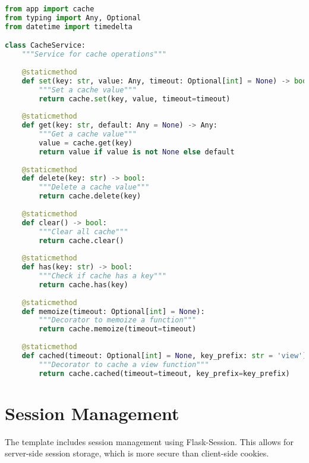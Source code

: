 \documentclass{article}
\begin{document}
\begin{lstlisting}[language=python, caption=Cache Service in app/services/cache\_service.py]
from app import cache
from typing import Any, Optional
from datetime import timedelta

class CacheService:
    """Service for cache operations"""
    
    @staticmethod
    def set(key: str, value: Any, timeout: Optional[int] = None) -> bool:
        """Set a cache value"""
        return cache.set(key, value, timeout=timeout)
    
    @staticmethod
    def get(key: str, default: Any = None) -> Any:
        """Get a cache value"""
        value = cache.get(key)
        return value if value is not None else default
    
    @staticmethod
    def delete(key: str) -> bool:
        """Delete a cache value"""
        return cache.delete(key)
    
    @staticmethod
    def clear() -> bool:
        """Clear all cache"""
        return cache.clear()
    
    @staticmethod
    def has(key: str) -> bool:
        """Check if cache has a key"""
        return cache.has(key)
    
    @staticmethod
    def memoize(timeout: Optional[int] = None):
        """Decorator to memoize a function"""
        return cache.memoize(timeout=timeout)
    
    @staticmethod
    def cached(timeout: Optional[int] = None, key_prefix: str = 'view'):
        """Decorator to cache a view function"""
        return cache.cached(timeout=timeout, key_prefix=key_prefix)
\end{lstlisting}

\section{Session Management}

The template includes session management using Flask-Session. This allows for server-side session storage, which is more secure than client-side cookies.
\end{document}
